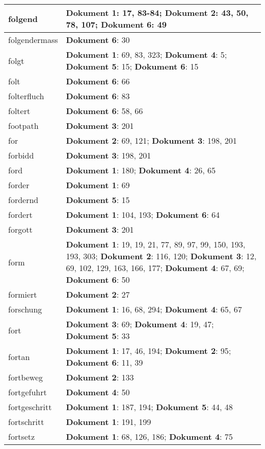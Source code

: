\documentclass[a5paper]{article}
\begin{document}
\begin{longtable}[l]{|l|p{3in}|}
\hline
folgend & \textbf{Dokument 1}: 17, 83-84; \textbf{Dokument 2}: 43, 50, 78, 107; \textbf{Dokument 6}: 49 \\
\hline
folgendermass & \textbf{Dokument 6}: 30 \\
\hline
folgt & \textbf{Dokument 1}: 69, 83, 323; \textbf{Dokument 4}: 5; \textbf{Dokument 5}: 15; \textbf{Dokument 6}: 15 \\
\hline
folt & \textbf{Dokument 6}: 66 \\
\hline
folterfluch & \textbf{Dokument 6}: 83 \\
\hline
foltert & \textbf{Dokument 6}: 58, 66 \\
\hline
footpath & \textbf{Dokument 3}: 201 \\
\hline
for & \textbf{Dokument 2}: 69, 121; \textbf{Dokument 3}: 198, 201 \\
\hline
forbidd & \textbf{Dokument 3}: 198, 201 \\
\hline
ford & \textbf{Dokument 1}: 180; \textbf{Dokument 4}: 26, 65 \\
\hline
forder & \textbf{Dokument 1}: 69 \\
\hline
fordernd & \textbf{Dokument 5}: 15 \\
\hline
fordert & \textbf{Dokument 1}: 104, 193; \textbf{Dokument 6}: 64 \\
\hline
forgott & \textbf{Dokument 3}: 201 \\
\hline
form & \textbf{Dokument 1}: 19, 19, 21, 77, 89, 97, 99, 150, 193, 193, 303; \textbf{Dokument 2}: 116, 120; \textbf{Dokument 3}: 12, 69, 102, 129, 163, 166, 177; \textbf{Dokument 4}: 67, 69; \textbf{Dokument 6}: 50 \\
\hline
formiert & \textbf{Dokument 2}: 27 \\
\hline
forschung & \textbf{Dokument 1}: 16, 68, 294; \textbf{Dokument 4}: 65, 67 \\
\hline
fort & \textbf{Dokument 3}: 69; \textbf{Dokument 4}: 19, 47; \textbf{Dokument 5}: 33 \\
\hline
fortan & \textbf{Dokument 1}: 17, 46, 194; \textbf{Dokument 2}: 95; \textbf{Dokument 6}: 11, 39 \\
\hline
fortbeweg & \textbf{Dokument 2}: 133 \\
\hline
fortgefuhrt & \textbf{Dokument 4}: 50 \\
\hline
fortgeschritt & \textbf{Dokument 1}: 187, 194; \textbf{Dokument 5}: 44, 48 \\
\hline
fortschritt & \textbf{Dokument 1}: 191, 199 \\
\hline
fortsetz & \textbf{Dokument 1}: 68, 126, 186; \textbf{Dokument 4}: 75 \\

\end{longtable}
\end{document}

